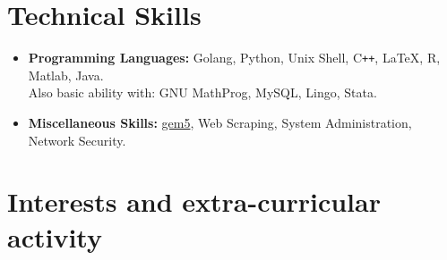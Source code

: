 \documentclass[12pt,a4paper,sans,colorlinks]{moderncv}        %
\begin{document}
% 
 

\section{Technical Skills}

\vspace{6pt}

\begin{itemize}

\item \textbf{Programming Languages:} Golang, Python, Unix Shell, C\texttt{++}, \LaTeX, R, Matlab, Java.\\ Also basic ability with: GNU MathProg, MySQL, Lingo, Stata.

\vspace{6pt}

\item \textbf{Miscellaneous Skills:} \href{https://www.gem5.org/}{gem5}, Web Scraping, System Administration, Network Security.

\end{itemize}

\section{Interests and extra-curricular activity}

\vspace{6pt}
\end{document}
